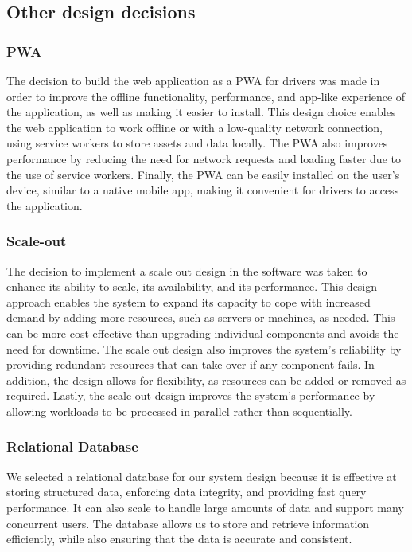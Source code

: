 \subsection{Other design decisions}
\subsubsection{PWA}
The decision to build the web application as a PWA for drivers was made in order to improve the offline functionality, performance, and app-like experience of the application, as well as making it easier to install. This design choice enables the web application to work offline or with a low-quality network connection, using service workers to store assets and data locally. The PWA also improves performance by reducing the need for network requests and loading faster due to the use of service workers. Finally, the PWA can be easily installed on the user's device, similar to a native mobile app, making it convenient for drivers to access the application.
\subsubsection{Scale-out}
The decision to implement a scale out design in the software was taken to enhance its ability to scale, its availability, and its performance. This design approach enables the system to expand its capacity to cope with increased demand by adding more resources, such as servers or machines, as needed. This can be more cost-effective than upgrading individual components and avoids the need for downtime. The scale out design also improves the system's reliability by providing redundant resources that can take over if any component fails. In addition, the design allows for flexibility, as resources can be added or removed as required. Lastly, the scale out design improves the system's performance by allowing workloads to be processed in parallel rather than sequentially.

\subsubsection{Relational Database}
We selected a relational database for our system design because it is effective at storing structured data, enforcing data integrity, and providing fast query performance. It can also scale to handle large amounts of data and support many concurrent users. The database allows us to store and retrieve information efficiently, while also ensuring that the data is accurate and consistent.
